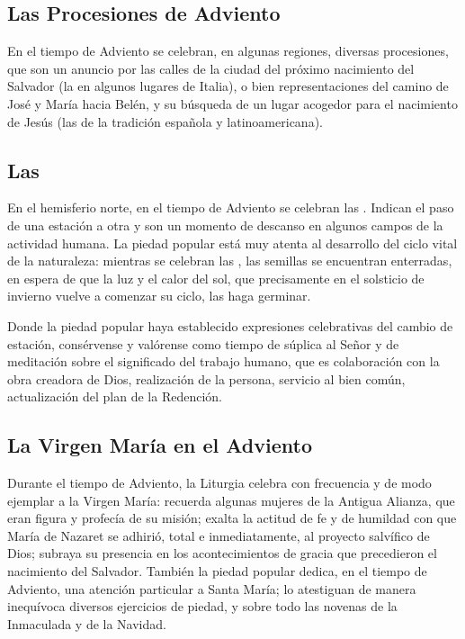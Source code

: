 \begin{introstyle}
	\subsection{Las Procesiones de Adviento}
	
	En el tiempo de Adviento se celebran, en algunas regiones, diversas procesiones, que son un anuncio por las calles de la ciudad del próximo nacimiento del Salvador (la  en algunos lugares de Italia), o bien representaciones del camino de José y María hacia Belén, y su búsqueda de un lugar acogedor para el nacimiento de Jesús (las  de la tradición española y latinoamericana).

	\subsection{Las }
	
	En el hemisferio norte, en el tiempo de Adviento se celebran las . Indican el paso de una estación a otra y son un momento de descanso en algunos campos de la actividad humana. La piedad popular está muy atenta al desarrollo del ciclo vital de la naturaleza: mientras se celebran las , las semillas se encuentran enterradas, en espera de que la luz y el calor del sol, que precisamente en el solsticio de invierno vuelve a comenzar su ciclo, las haga germinar.
	
	Donde la piedad popular haya establecido expresiones celebrativas del cambio de estación, consérvense y valórense como tiempo de súplica al Señor y de meditación sobre el significado del trabajo humano, que es colaboración con la obra creadora de Dios, realización de la persona, servicio al bien común, actualización del plan de la Redención.
	
	\subsection{La Virgen María en el Adviento}
	
	Durante el tiempo de Adviento, la Liturgia celebra con frecuencia y de modo ejemplar a la Virgen María: recuerda algunas mujeres de la Antigua Alianza, que eran figura y profecía de su misión; exalta la actitud de fe y de humildad con que María de Nazaret se adhirió, total e inmediatamente, al proyecto salvífico de Dios; subraya su presencia en los acontecimientos de gracia que precedieron el nacimiento del Salvador. También la piedad popular dedica, en el tiempo de Adviento, una atención particular a Santa María; lo atestiguan de manera inequívoca diversos ejercicios de piedad, y sobre todo las novenas de la Inmaculada y de la Navidad.
	

\end{introstyle}
